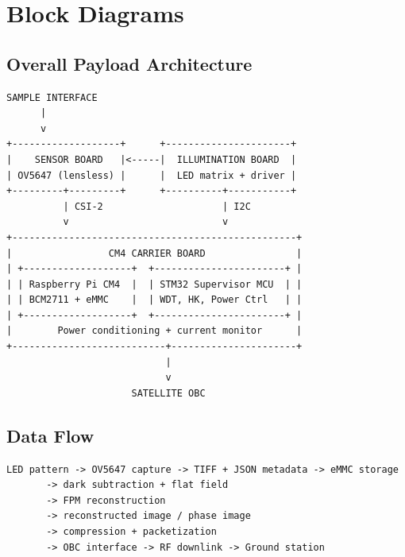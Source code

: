 \section{Block Diagrams}

\subsection{Overall Payload Architecture}
\begin{lstlisting}[basicstyle=\ttfamily\small,frame=single]
SAMPLE INTERFACE
      |
      v
+-------------------+      +----------------------+
|    SENSOR BOARD   |<-----|  ILLUMINATION BOARD  |
| OV5647 (lensless) |      |  LED matrix + driver |
+---------+---------+      +----------+-----------+
          | CSI-2                     | I2C
          v                           v
+--------------------------------------------------+
|                 CM4 CARRIER BOARD                |
| +-------------------+  +-----------------------+ |
| | Raspberry Pi CM4  |  | STM32 Supervisor MCU  | |
| | BCM2711 + eMMC    |  | WDT, HK, Power Ctrl   | |
| +-------------------+  +-----------------------+ |
|        Power conditioning + current monitor      |
+---------------------------+----------------------+
                            |
                            v
                      SATELLITE OBC
\end{lstlisting}

\subsection{Data Flow}
\begin{lstlisting}[basicstyle=\ttfamily\small,frame=single]
LED pattern -> OV5647 capture -> TIFF + JSON metadata -> eMMC storage
       -> dark subtraction + flat field
       -> FPM reconstruction
       -> reconstructed image / phase image
       -> compression + packetization
       -> OBC interface -> RF downlink -> Ground station
\end{lstlisting}
